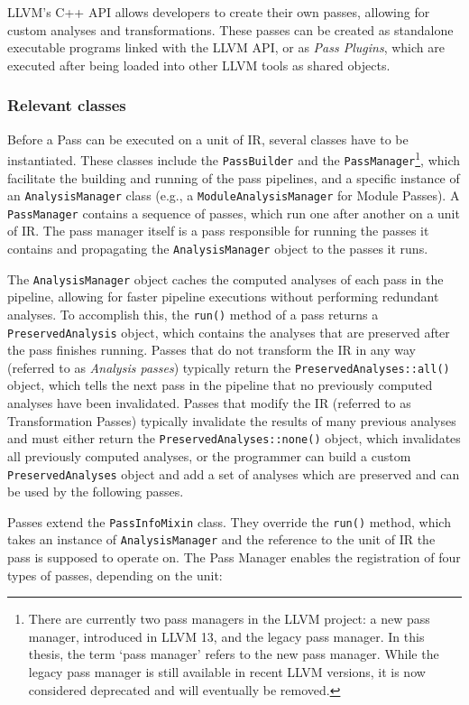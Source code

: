 LLVM's C++ API allows developers to create their own passes, allowing for custom analyses and transformations. These passes can be created as standalone executable programs linked with the LLVM API, or as \emph{Pass Plugins}, which are executed after being loaded into other LLVM tools as shared objects.

\subsubsection{Relevant classes}
Before a Pass can be executed on a unit of IR, several classes have to be instantiated. These classes include the \texttt{PassBuilder} and the \texttt{PassManager}\footnote{There are currently two pass managers in the LLVM project: a new pass manager, introduced in LLVM 13, and the legacy pass manager. In this thesis, the term `pass manager' refers to the new pass manager. While the legacy pass manager is still available in recent LLVM versions, it is now considered deprecated and will eventually be removed.}, which facilitate the building and running of the pass pipelines, and a specific instance of an \texttt{AnalysisManager} class (e.g., a \texttt{ModuleAnalysisManager} for Module Passes).
A \texttt{PassManager} contains a sequence of passes, which run one after another on a unit of IR. The pass manager itself is a pass responsible for running the passes it contains and propagating the \texttt{AnalysisManager} object to the passes it runs.

The \texttt{AnalysisManager} object caches the computed analyses of each pass in the pipeline, allowing for faster pipeline executions without performing redundant analyses. To accomplish this, the \texttt{run()} method of a pass returns a \texttt{PreservedAnalysis} object, which contains the analyses that are preserved after the pass finishes running. Passes that do not transform the IR in any way (referred to as \emph{Analysis passes}) typically return the \texttt{PreservedAnalyses::all()} object, which tells the next pass in the pipeline that no previously computed analyses have been invalidated. Passes that modify the IR (referred to as Transformation Passes) typically invalidate the results of many previous analyses and must either return the \texttt{PreservedAnalyses::none()} object, which invalidates all previously computed analyses, or the programmer can build a custom \texttt{PreservedAnalyses} object and add a set of analyses which are preserved and can be used by the following passes.

Passes extend the \texttt{PassInfoMixin} class. They override the \texttt{run()} method, which takes an instance of \texttt{AnalysisManager} and the reference to the unit of IR the pass is supposed to operate on. The Pass Manager enables the registration of four types of passes, depending on the unit:

